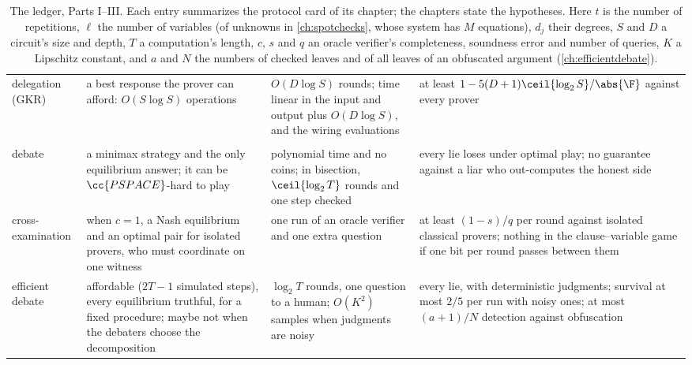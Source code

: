 \begin{refsection}
\begin{table}[p]
\begin{fullwidth}
\begin{tabularx}{\linewidth}{@{}>{\raggedright\arraybackslash}p{24mm}>{\raggedright\arraybackslash}X>{\raggedright\arraybackslash}X>{\raggedright\arraybackslash}X@{}}
6\enspace delegation (GKR) & a best response the prover can afford: $O(S\log S)$ operations & $O(D\log S)$ rounds; time linear in the input and output plus $O(D\log S)$, and the wiring evaluations & at least $1-5(D+1)\ceil{\log_2S}/\abs{\F}$ against every prover \\[0.4ex]
\multicolumn{4}{@{}l}{\textsc{\color{prover}part iii. competition}}\\[0.3ex]
7\enspace debate & a minimax strategy and the only equilibrium answer; it can be $\cc{PSPACE}$-hard to play & polynomial time and no coins; in bisection, $\ceil{\log_2T}$ rounds and one step checked & every lie loses under optimal play; no guarantee against a liar who out-computes the honest side \\
8\enspace cross-examination & when $c=1$, a Nash equilibrium and an optimal pair for isolated provers, who must coordinate on one witness & one run of an oracle verifier and one extra question & at least $(1-s)/q$ per round against isolated classical provers; nothing in the clause--variable game if one bit per round passes between them \\
9\enspace efficient debate & affordable ($2T-1$ simulated steps), every equilibrium truthful, for a fixed procedure; maybe not when the debaters choose the decomposition & $\log_2T$ rounds, one question to a human; $O(K^2)$ samples when judgments are noisy & every lie, with deterministic judgments; survival at most $2/5$ per run with noisy ones; at most $(a+1)/N$ detection against obfuscation \\
\bottomrule
\end{tabularx}
\end{fullwidth}
\caption{The ledger, Parts I--III. Each entry summarizes the protocol card of its chapter; the chapters state the hypotheses. Here $t$ is the number of repetitions, $\ell$ the number of variables (of unknowns in \cref{ch:spotchecks}, whose system has $M$ equations), $d_j$ their degrees, $S$ and $D$ a circuit's size and depth, $T$ a computation's length, $c$, $s$ and $q$ an oracle verifier's completeness, soundness error and number of queries, $K$ a Lipschitz constant, and $a$ and $N$ the numbers of checked leaves and of all leaves of an obfuscated argument (\cref{ch:efficientdebate}).}\label{tab:epilogue:ledger1}
\end{table}


\end{refsection}
